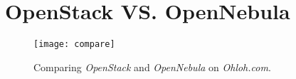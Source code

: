 \chapter{OpenStack VS. OpenNebula} \label{chap:ap2}

\begin{figure}[h!]
  \begin{center}
    \leavevmode 
    \texttt{[image: compare]}
    \caption{Comparing \textit{OpenStack} and \textit{OpenNebula} on \textit{Ohloh.com}.\cite{ohloh}}
    \label{fig:ohloh_compare}
  \end{center}
\end{figure}

\clearpage

